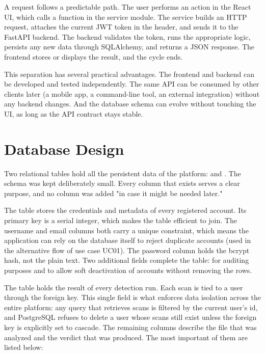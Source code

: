 A request follows a predictable path. The user performs an action in the React UI, which calls a function in the  service module. The service builds an HTTP request, attaches the current JWT token in the  header, and sends it to the FastAPI backend. The backend validates the token, runs the appropriate logic, persists any new data through SQLAlchemy, and returns a JSON response. The frontend stores or displays the result, and the cycle ends.

This separation has several practical advantages. The frontend and backend can be developed and tested independently. The same API can be consumed by other clients later (a mobile app, a command-line tool, an external integration) without any backend changes. And the database schema can evolve without touching the UI, as long as the API contract stays stable.

\section{Database Design}

Two relational tables hold all the persistent data of the platform:  and . The schema was kept deliberately small. Every column that exists serves a clear purpose, and no column was added "in case it might be needed later."

The  table stores the credentials and metadata of every registered account. Its primary key is a serial integer, which makes the table efficient to join. The username and email columns both carry a unique constraint, which means the application can rely on the database itself to reject duplicate accounts (used in the alternative flow of use case UC01). The password column holds the bcrypt hash, not the plain text. Two additional fields complete the table:  for auditing purposes and  to allow soft deactivation of accounts without removing the rows.

The  table holds the result of every detection run. Each scan is tied to a user through the  foreign key. This single field is what enforces data isolation across the entire platform: any query that retrieves scans is filtered by the current user's id, and PostgreSQL refuses to delete a user whose scans still exist unless the foreign key is explicitly set to cascade. The remaining columns describe the file that was analyzed and the verdict that was produced. The most important of them are listed below:

